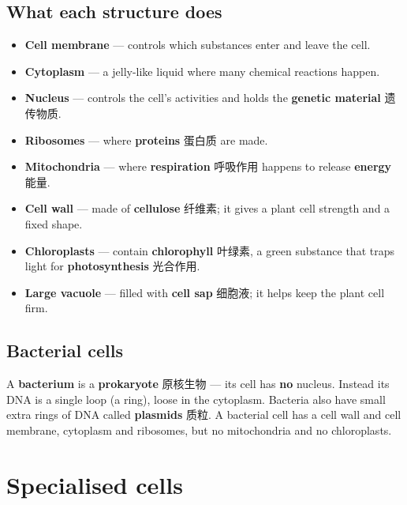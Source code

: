 \documentclass[11pt]{article}
\begin{document}
\subsection*{What each structure does}

\begin{itemize}
\item \textbf{Cell membrane} — controls which substances enter and leave the cell.

\item \textbf{Cytoplasm} — a jelly-like liquid where many chemical reactions happen.

\item \textbf{Nucleus} — controls the cell's activities and holds the \textbf{genetic material} 遗传物质.

\item \textbf{Ribosomes} — where \textbf{proteins} 蛋白质 are made.

\item \textbf{Mitochondria} — where \textbf{respiration} 呼吸作用 happens to release \textbf{energy} 能量.

\item \textbf{Cell wall} — made of \textbf{cellulose} 纤维素; it gives a plant cell strength and a fixed shape.

\item \textbf{Chloroplasts} — contain \textbf{chlorophyll} 叶绿素, a green substance that traps light for \textbf{photosynthesis} 光合作用.

\item \textbf{Large vacuole} — filled with \textbf{cell sap} 细胞液; it helps keep the plant cell firm.

\end{itemize}

\subsection*{Bacterial cells}

A \textbf{bacterium} is a \textbf{prokaryote} 原核生物 — its cell has \textbf{no} nucleus. Instead its DNA is a single loop (a ring), loose in the cytoplasm. Bacteria also have small extra rings of DNA called \textbf{plasmids} 质粒. A bacterial cell has a cell wall and cell membrane, cytoplasm and ribosomes, but no mitochondria and no chloroplasts.

\section*{Specialised cells}
\end{document}
